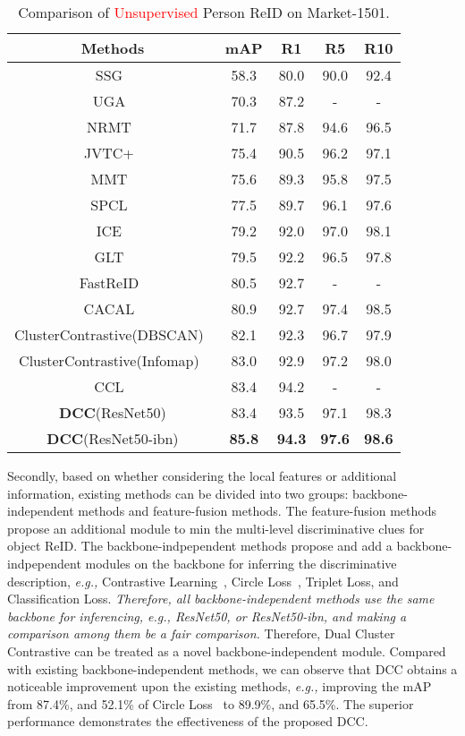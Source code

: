 \documentclass[10pt,twocolumn,letterpaper]{article}
\begin{document}
\begin{table}
\footnotesize
\begin{center}
\begin{tabular}{c|cccc}
\toprule
Methods           & mAP& R1 & R5 & R10\\
\midrule
SSG~\cite{fu2019self} & 58.3& 80.0 & 90.0 & 92.4\\
UGA~\cite{wu2019unsupervised} & 70.3 & 87.2 & - & -\\
NRMT~\cite{zhai2020multiple} & 71.7 & 87.8& 94.6 & 96.5\\
JVTC+~\cite{chen2021joint} &75.4&90.5&96.2&97.1\\
MMT~\cite{ge2020mutual} & 75.6 & 89.3 & 95.8& 97.5 \\
SPCL~\cite{DBLP:conf/nips/Ge0C0L20} & 77.5 & 89.7 & 96.1 & 97.6 \\
ICE~\cite{chen2021ice} & 79.2 & 92.0 & 97.0& 98.1 \\
GLT~\cite{zheng2021group} & 79.5 & 92.2 & 96.5 & 97.8 \\
FastReID~\cite{he2020fastreid} & 80.5& 92.7 & - &- \\
CACAL~\cite{li2021cluster} & 80.9 & 92.7 & 97.4 & 98.5 \\
ClusterContrastive(DBSCAN)~\cite{dai2021cluster} & 82.1 & 92.3 & 96.7 & 97.9 \\
ClusterContrastive(Infomap)~\cite{dai2021cluster} & 83.0 & 92.9 & 97.2 & 98.0 \\
CCL~\cite{isobe2021towards} & 83.4 & 94.2 & - & - \\
\textbf{DCC}(ResNet50) &83.4&93.5&97.1&98.3\\
\textbf{DCC}(ResNet50-ibn) &\textbf{85.8}&\textbf{94.3}&\textbf{97.6}&\textbf{98.6}\\
\bottomrule
\end{tabular}
\caption{\small Comparison of \textcolor{red}{Unsupervised} Person ReID on Market-1501.}
\label{tab:unsupervised_market}
\end{center}
\end{table}


Secondly, based on whether considering the local features or additional information, existing methods can be divided into two groups: backbone-independent methods and feature-fusion methods.
The feature-fusion methods propose an additional module to min the multi-level discriminative clues for object ReID.
The backbone-indpependent methods propose and add a backbone-indpependent modules on the backbone for inferring the discriminative description, \emph{e.g.,} Contrastive Learning~\cite{dai2021cluster}, Circle Loss~\cite{sun2020circle}, Triplet Loss, and Classification Loss. 
\emph{Therefore, all backbone-independent methods use the same backbone for inferencing,  \emph{e.g.,} ResNet50, or ResNet50-ibn, and making a comparison among them be a fair comparison.}
Therefore, Dual Cluster Contrastive can be treated as a novel backbone-independent module.
Compared with existing backbone-independent methods, we can observe that DCC obtains a noticeable improvement upon the existing methods, \emph{e.g.,} improving the mAP from 87.4\%, and 52.1\% of Circle Loss~\cite{sun2020circle} to 89.9\%, and 65.5\%. 
The superior performance demonstrates the effectiveness of the proposed DCC. 
\end{document}
